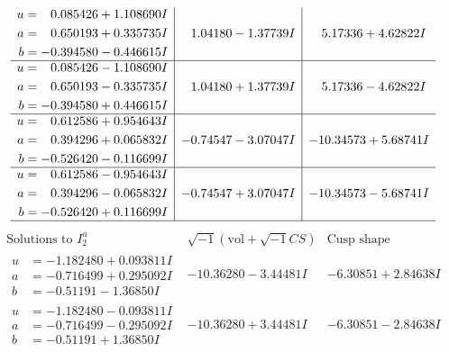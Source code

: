 \documentclass[1p]{elsarticle_modified}
\theoremstyle{definition}
\newcommand{\I}{\sqrt{-1}}
\begin{document}
$$\begin{array}{c|c|c}
\begin{aligned}
u &= \phantom{-}0.085426 + 1.108690 I \\
a &= \phantom{-}0.650193 + 0.335735 I \\
b &= -0.394580 - 0.446615 I\end{aligned}
 & \phantom{-}1.04180 - 1.37739 I & \phantom{-}5.17336 + 4.62822 I \\ \hline\begin{aligned}
u &= \phantom{-}0.085426 - 1.108690 I \\
a &= \phantom{-}0.650193 - 0.335735 I \\
b &= -0.394580 + 0.446615 I\end{aligned}
 & \phantom{-}1.04180 + 1.37739 I & \phantom{-}5.17336 - 4.62822 I \\ \hline\begin{aligned}
u &= \phantom{-}0.612586 + 0.954643 I \\
a &= \phantom{-}0.394296 + 0.065832 I \\
b &= -0.526420 - 0.116699 I\end{aligned}
 & -0.74547 - 3.07047 I & -10.34573 + 5.68741 I \\ \hline\begin{aligned}
u &= \phantom{-}0.612586 - 0.954643 I \\
a &= \phantom{-}0.394296 - 0.065832 I \\
b &= -0.526420 + 0.116699 I\end{aligned}
 & -0.74547 + 3.07047 I & -10.34573 - 5.68741 I\\
 \hline 
 \end{array}$$\newpage$$\begin{array}{c|c|c}  
\text{Solutions to }I^u_{2}& \I (\text{vol} + \sqrt{-1}CS) & \text{Cusp shape}\\
 \hline 
\begin{aligned}
u &= -1.182480 + 0.093811 I \\
a &= -0.716499 + 0.295092 I \\
b &= -0.51191 - 1.36850 I\end{aligned}
 & -10.36280 - 3.44481 I & -6.30851 + 2.84638 I \\ \hline\begin{aligned}
u &= -1.182480 - 0.093811 I \\
a &= -0.716499 - 0.295092 I \\
b &= -0.51191 + 1.36850 I\end{aligned}
 & -10.36280 + 3.44481 I & -6.30851 - 2.84638 I \\ \hline\begin{aligned}

\end{aligned}
\end{array}$$
\end{document}
